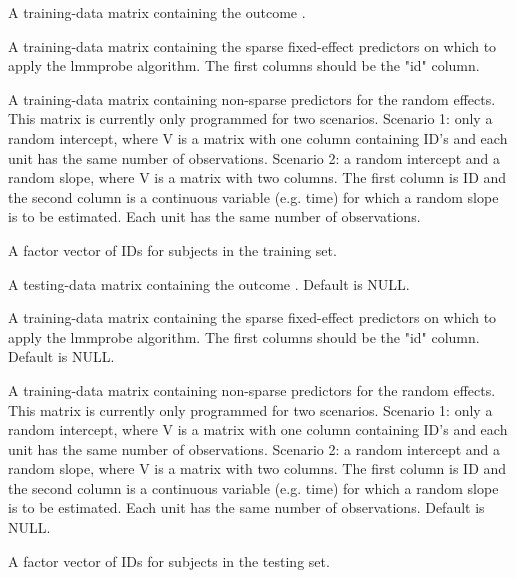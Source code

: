 \documentclass[a4paper]{book}
\begin{document}
\begin{Arguments}
\begin{ldescription}
\item[\code{Y}] A training-data matrix containing the outcome .

\item[\code{Z}] A training-data matrix containing the sparse fixed-effect predictors on which to apply the lmmprobe algorithm. The first columns should be the "id" column.

\item[\code{V}] A training-data matrix containing non-sparse predictors for the random effects. This matrix is currently only programmed for two scenarios. Scenario 1: only a random intercept, where V is a matrix with one column containing ID's and each unit has the same number of observations. Scenario 2: a random intercept and a random slope, where V is a matrix with two columns. The first column is ID and the second column is a continuous variable (e.g. time) for which a random slope is to be estimated. Each unit has the same number of observations.

\item[\code{ID\_data}] A factor vector of IDs for subjects in the training set.

\item[\code{Y\_test}] A testing-data matrix containing the outcome . Default is NULL.

\item[\code{Z\_test}] A training-data matrix containing the sparse fixed-effect predictors on which to apply the lmmprobe algorithm. The first columns should be the "id" column. Default is NULL.

\item[\code{V\_test}] A training-data matrix containing non-sparse predictors for the random effects. This matrix is currently only programmed for two scenarios. Scenario 1: only a random intercept, where V is a matrix with one column containing ID's and each unit has the same number of observations. Scenario 2: a random intercept and a random slope, where V is a matrix with two columns. The first column is ID and the second column is a continuous variable (e.g. time) for which a random slope is to be estimated. Each unit has the same number of observations. Default is NULL.

\item[\code{ID\_test}] A factor vector of IDs for subjects in the testing set.


\end{ldescription}
\end{Arguments}
\end{document}

